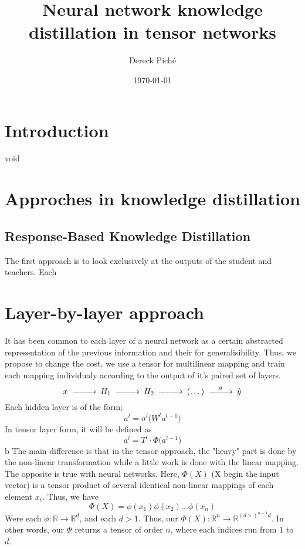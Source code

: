 \documentclass[11pt]{article}
\title{Neural network knowledge distillation in tensor networks}
\author{Dereck Piché}
\date{\today}
\begin{document}
\maketitle
\begin{abstract}
\end{abstract}

\section{Introduction}
void


\section{Approches in knowledge distillation}
\subsection{Response-Based Knowledge Distillation}
The first approach is to look exclusively at the outputs
of the student and teachers. Each 

\section{Layer-by-layer approach}
It has been common to each layer of a neural network as a certain abstracted 
representation of the previous information and their for generalisibility. 
Thus, we propose to change the cost, we use a tensor for multilinear mapping 
and train each mapping individualy according to the output of it's paired set of layers. 
\begin{equation*}
\begin{CD}
    x @>>>H_1 @>>>H_2 @>>>(\dots)@>g>> \hat{y}
\end{CD}
\end{equation*}
Each hidden layer is of the form;
\begin{equation*}
    a^l = \sigma^l \bigl( W^l a^{l-1} \bigr)
\end{equation*}
In tensor layer form, it will be defined as 
\begin{equation*}
    a^l = T^l \cdot \Phi \bigl( a^{l-1} \bigr)
\end{equation*}b
The main difference is that in the tensor approach, the "heavy" part is done by the non-linear transformation while a little work is done with the linear mapping. The opposite is true with neural networks. Here, $\Phi(X)$ (X begin the input vector) is a tensor product of several identical non-linear mappings of each element $x_i$. Thus, we have 
\begin{equation*}
    \Phi(X) = \phi(x_1)\phi(x_2)\dots\phi(x_n)
\end{equation*}
Were each $\phi : \mathbb{R} \rightarrow \mathbb{R}^d$, and each $d > 1$. Thus, our $\Phi(X) : \mathbb{R}^n \rightarrow \mathbb{R}^{ (d \times)^{n-1}d} $. In other words, our $\Phi$ returns a tensor of order $n$, where each indices run from $1$ to $d$.
\end{document}

